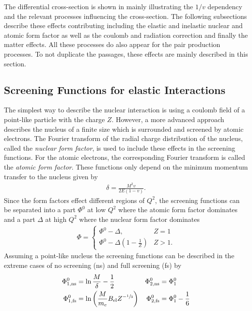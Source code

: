 The differential cross-section is shown in  mainly illustrating the $1/v$ dependency and the relevant processes influencing the cross-section.
The following subsections describe these effects contributing including the elastic and inelastic nuclear and atomic form factor as well as the coulomb and radiation correction and finally the matter effects.
All these processes do also appear for the pair production processes.
To not duplicate the passages, these effects are mainly described in this section.

\subsection{Screening Functions for elastic Interactions} \label{sec:brems_screen}

The simplest way to describe the nuclear interaction is using a coulomb field of a point-like particle with the charge $Z$.
However, a more advanced approach describes the nucleus of a finite size which is surrounded and screened by atomic electrons.
The Fourier transform of the radial charge distribution of the nucleus, called the \textit{nuclear form factor}, is used to include these effects in the screening functions.
For the atomic electrons, the corresponding Fourier transform is called the \textit{atomic form factor}.
These functions only depend on the minimum momentum transfer to the nucleus given by
\begin{align}
    \delta = \frac{M^2 v}{2E(1 - v)}.
\end{align}
Since the form factors effect different regions of $Q^2$, the screening functions can be separated into a part $\Phi^0$ at low $Q^2$ where the atomic form factor dominates and a part $\Delta$ at high $Q^2$ where the nuclear form factor dominates
\begin{align} \label{eq:screen}
    \Phi = \begin{cases}
        \Phi^0 - \Delta, & Z=1 \\
        \Phi^0 - \Delta(1 - \frac{1}{Z}) & Z>1.
    \end{cases}
\end{align}
Assuming a point-like nucleus the screening functions can be described in the extreme cases of no screening (ns) and full screening (fs) by
\begin{subequations} \label{eq:brems_ns_fs}
\begin{align}
    \Phi_{1, \mathrm{ns}}^0 &= \operatorname{ln} \frac{M}{\delta} - \frac{1}{2}
    & \Phi_{2, \mathrm{ns}}^0 &= \Phi_1^0
    \\
    \Phi_{1, \mathrm{fs}}^0 &= \operatorname{ln} \left( \frac{M}{m_e} B_{\text{el}} Z^{-\sfrac13} \right)
    & \Phi_{2, \mathrm{fs}}^0 &= \Phi_1^0 - \frac{1}{6}
\end{align}
\end{subequations}
